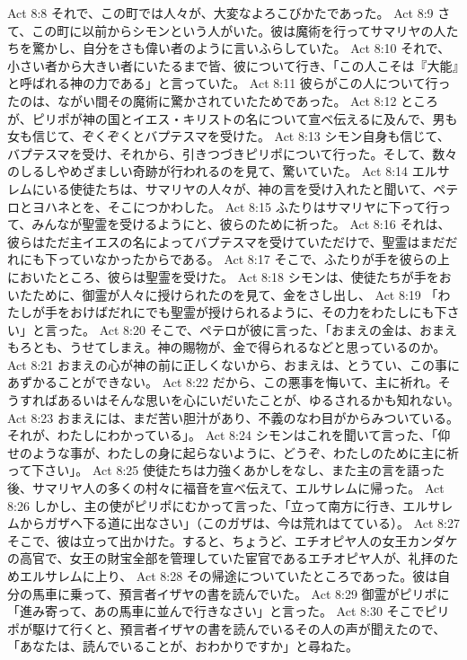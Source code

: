 Act 8:8  それで、この町では人々が、大変なよろこびかたであった。
Act 8:9  さて、この町に以前からシモンという人がいた。彼は魔術を行ってサマリヤの人たちを驚かし、自分をさも偉い者のように言いふらしていた。
Act 8:10  それで、小さい者から大きい者にいたるまで皆、彼について行き、「この人こそは『大能』と呼ばれる神の力である」と言っていた。
Act 8:11  彼らがこの人について行ったのは、ながい間その魔術に驚かされていたためであった。
Act 8:12  ところが、ピリポが神の国とイエス・キリストの名について宣べ伝えるに及んで、男も女も信じて、ぞくぞくとバプテスマを受けた。
Act 8:13  シモン自身も信じて、バプテスマを受け、それから、引きつづきピリポについて行った。そして、数々のしるしやめざましい奇跡が行われるのを見て、驚いていた。
Act 8:14  エルサレムにいる使徒たちは、サマリヤの人々が、神の言を受け入れたと聞いて、ペテロとヨハネとを、そこにつかわした。
Act 8:15  ふたりはサマリヤに下って行って、みんなが聖霊を受けるようにと、彼らのために祈った。
Act 8:16  それは、彼らはただ主イエスの名によってバプテスマを受けていただけで、聖霊はまだだれにも下っていなかったからである。
Act 8:17  そこで、ふたりが手を彼らの上においたところ、彼らは聖霊を受けた。
Act 8:18  シモンは、使徒たちが手をおいたために、御霊が人々に授けられたのを見て、金をさし出し、
Act 8:19  「わたしが手をおけばだれにでも聖霊が授けられるように、その力をわたしにも下さい」と言った。
Act 8:20  そこで、ペテロが彼に言った、「おまえの金は、おまえもろとも、うせてしまえ。神の賜物が、金で得られるなどと思っているのか。
Act 8:21  おまえの心が神の前に正しくないから、おまえは、とうてい、この事にあずかることができない。
Act 8:22  だから、この悪事を悔いて、主に祈れ。そうすればあるいはそんな思いを心にいだいたことが、ゆるされるかも知れない。
Act 8:23  おまえには、まだ苦い胆汁があり、不義のなわ目がからみついている。それが、わたしにわかっている」。
Act 8:24  シモンはこれを聞いて言った、「仰せのような事が、わたしの身に起らないように、どうぞ、わたしのために主に祈って下さい」。
Act 8:25  使徒たちは力強くあかしをなし、また主の言を語った後、サマリヤ人の多くの村々に福音を宣べ伝えて、エルサレムに帰った。
Act 8:26  しかし、主の使がピリポにむかって言った、「立って南方に行き、エルサレムからガザへ下る道に出なさい」（このガザは、今は荒れはてている）。
Act 8:27  そこで、彼は立って出かけた。すると、ちょうど、エチオピヤ人の女王カンダケの高官で、女王の財宝全部を管理していた宦官であるエチオピヤ人が、礼拝のためエルサレムに上り、
Act 8:28  その帰途についていたところであった。彼は自分の馬車に乗って、預言者イザヤの書を読んでいた。
Act 8:29  御霊がピリポに「進み寄って、あの馬車に並んで行きなさい」と言った。
Act 8:30  そこでピリポが駆けて行くと、預言者イザヤの書を読んでいるその人の声が聞えたので、「あなたは、読んでいることが、おわかりですか」と尋ねた。
